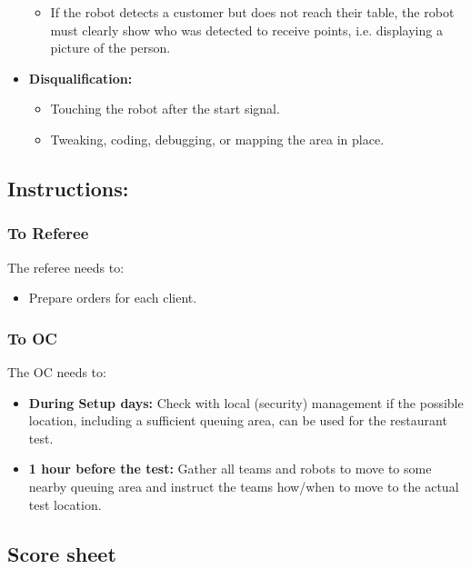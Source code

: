 \begin{itemize}
\begin{itemize}
		\item If the robot detects a customer but does not reach their table, the robot must clearly show who was detected to receive points, i.e. displaying a picture of the person.
	\end{itemize}
	\item \textbf{Disqualification:}
	\begin{itemize}
		\item Touching the robot after the start signal.
		\item Tweaking, coding, debugging, or mapping the area in place.
	\end{itemize}
\end{itemize}

\subsection*{Instructions:}

\subsubsection*{To Referee}

The referee needs to:
\begin{itemize}
	\item Prepare orders for each client.
\end{itemize}

\subsubsection*{To OC}
The OC needs to:
\begin{itemize}[nosep]
	\item \textbf{During Setup days:} Check with local (security) management if the possible location, including a sufficient queuing area, can be used for the restaurant test.
	\item \textbf{1 hour before the test:} Gather all teams and robots to move to some nearby queuing area and instruct the teams how/when to move to the actual test location.
\end{itemize}

\newpage
\subsection*{Score sheet}


\cleardoublepage



